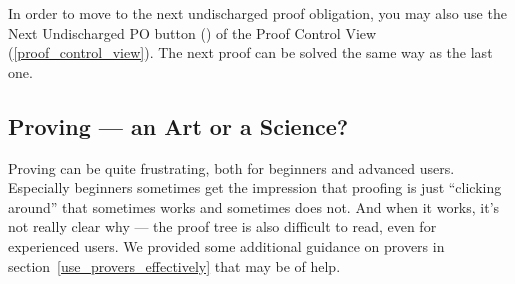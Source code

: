 In order to move to the next undischarged proof obligation, you may also use the \textsf{Next Undischarged PO button} () of the \textsf{Proof Control View} (\ref{proof_control_view}). The next proof can be solved the same way as the last one.


\subsection{Proving --- an Art or a Science?}
\label{tut_proving_an_art_or_a_science}

Proving can be quite frustrating, both for beginners and advanced users.  Especially beginners sometimes get the impression that proofing is just ``clicking around'' that sometimes works and sometimes does not.  And when it works, it's not really clear why --- the proof tree is also difficult to read, even for experienced users.  We provided some additional guidance on provers in section~\ref{use_provers_effectively} that may be of help.


